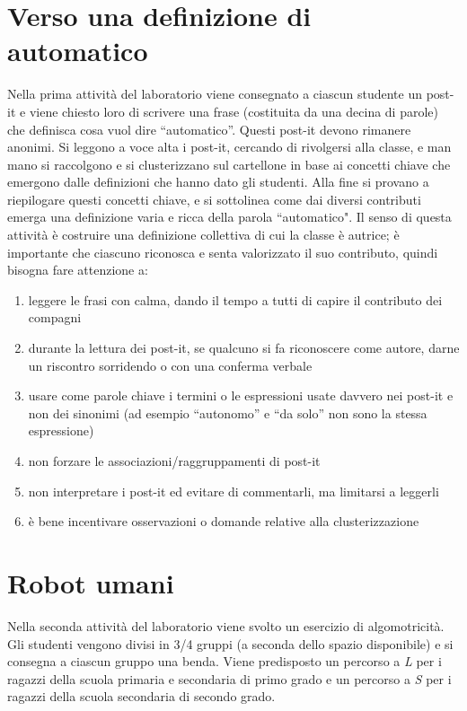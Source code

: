 \documentclass[12pt]{article}
\begin{document}
\section{Verso una definizione di automatico}
Nella prima attività del laboratorio viene consegnato a ciascun studente un post-it e viene chiesto loro di scrivere una frase (costituita da una decina di parole) che definisca cosa vuol dire ``automatico''. Questi post-it devono rimanere anonimi.
Si leggono a voce alta i post-it, cercando di rivolgersi alla classe, e man mano si raccolgono e si clusterizzano sul cartellone in base ai concetti chiave che emergono dalle definizioni che hanno dato gli studenti.
Alla fine si provano a riepilogare questi concetti chiave, e si sottolinea come dai diversi contributi emerga una definizione varia e ricca della parola ``automatico".
Il senso di questa attività è costruire una definizione collettiva di cui la classe è autrice; è importante che ciascuno riconosca e senta valorizzato il suo contributo, quindi bisogna fare attenzione a:
\begin{enumerate}
\item leggere le frasi con calma, dando il tempo a tutti di capire il contributo dei compagni
\item durante la lettura dei post-it, se qualcuno si fa riconoscere come autore, darne un riscontro sorridendo o con una conferma verbale
\item usare come parole chiave i termini o le espressioni usate davvero nei post-it e non dei sinonimi (ad esempio ``autonomo'' e ``da solo'' non sono la stessa espressione)
\item non forzare le associazioni/raggruppamenti di post-it
\item non interpretare i post-it ed evitare di commentarli, ma limitarsi a leggerli
\item è bene incentivare osservazioni o domande relative alla clusterizzazione
\end{enumerate}

\section{Robot umani}
Nella seconda attività del laboratorio viene svolto un esercizio di algomotricità.
Gli studenti vengono divisi in 3/4 gruppi (a seconda dello spazio disponibile) e si consegna a ciascun gruppo una benda. Viene predisposto un percorso a \textit{L} per i ragazzi della scuola primaria e secondaria di primo grado e un percorso a \textit{S} per i ragazzi della scuola secondaria di secondo grado. 
\end{document}
